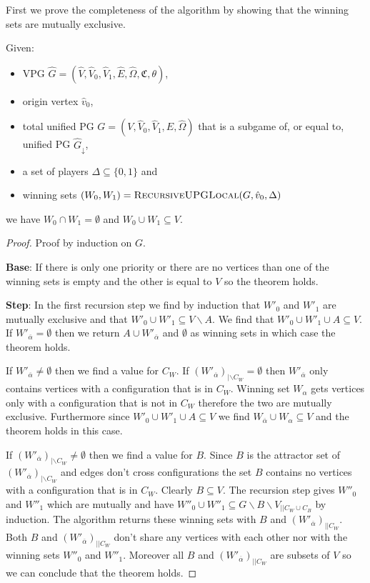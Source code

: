 First we prove the completeness of the algorithm by showing that the winning sets are mutually exclusive.
\begin{theorem}Given:
	\begin{itemize}
		\item VPG $\hat{G} = (\hat{V}, \hat{V}_0,\hat{V}_1,\hat{E},\hat{\Omega},\mathfrak{C},\theta)$,
		\item origin vertex $\hat{v}_0$,
		\item total unified PG $G = (V, \hat{V}_0, \hat{V}_1,E,\hat{\Omega})$ that is a subgame of, or equal to, unified PG $\hat{G}_{\downarrow}$,
		\item a set of players $\Delta \subseteq \{0,1\}$ and
		\item winning sets $(W_0,W_1) = \textsc{RecursiveUPGLocal}(G,\hat{v}_0,\Delta)$
	\end{itemize}
	we have $W_0\cap W_1 = \emptyset$ and $W_0 \cup W_1 \subseteq V$.
	\begin{proof}
		Proof by induction on $G$.
		
		\textbf{Base}: If there is only one priority or there are no vertices than one of the winning sets is empty and the other is equal to $V$ so the theorem holds.
		
		\textbf{Step}: In the first recursion step we find by induction that $W'_0$ and $W'_1$ are mutually exclusive and that $W'_0 \cup W'_1 \subseteq V\backslash A$. We find that $W'_0 \cup W'_1 \cup A \subseteq V$. If $W'_{\overline{\alpha}} = \emptyset$ then we return $A\cup W'_{\overline{\alpha}}$ and $\emptyset$ as winning sets in which case the theorem holds.
		
		If $W'_{\overline{\alpha}} \neq \emptyset$ then we find a value for $C_W$. If $(W'_{\overline{\alpha}})_{|\backslash C_W} = \emptyset$ then $W'_{\overline{\alpha}}$ only contains vertices with a configuration that is in $C_W$. Winning set $W_\alpha$ gets vertices only with a configuration that is not in $C_W$ therefore the two are mutually exclusive. Furthermore since $W'_0 \cup W'_1 \cup A \subseteq V$ we find $W_{\overline{\alpha}} \cup W_\alpha \subseteq V$ and the theorem holds in this case.
		
		If $(W'_{\overline{\alpha}})_{|\backslash C_W} \neq \emptyset$ then we find a value for $B$. Since $B$ is the attractor set of $(W'_{\overline{\alpha}})_{|\backslash C_W}$ and edges don't cross configurations the set $B$ contains no vertices with a configuration that is in $C_W$. Clearly $B \subseteq V$. The recursion step gives $W''_0$ and $W''_1$ which are mutually and have $W''_0 \cup W''_1 \subseteq G\backslash B \backslash V_{||C_W\cup C_B}$ by induction. The algorithm returns these winning sets with $B$ and $(W'_{\overline{\alpha}})_{||C_W}$. Both $B$ and $(W'_{\overline{\alpha}})_{||C_W}$ don't share any vertices with each other nor with the winning sets $W''_0$ and $W''_1$. Moreover all $B$ and $(W'_{\overline{\alpha}})_{||C_W}$ are subsets of $V$ so we can conclude that the theorem holds.
	\end{proof}
\end{theorem}

